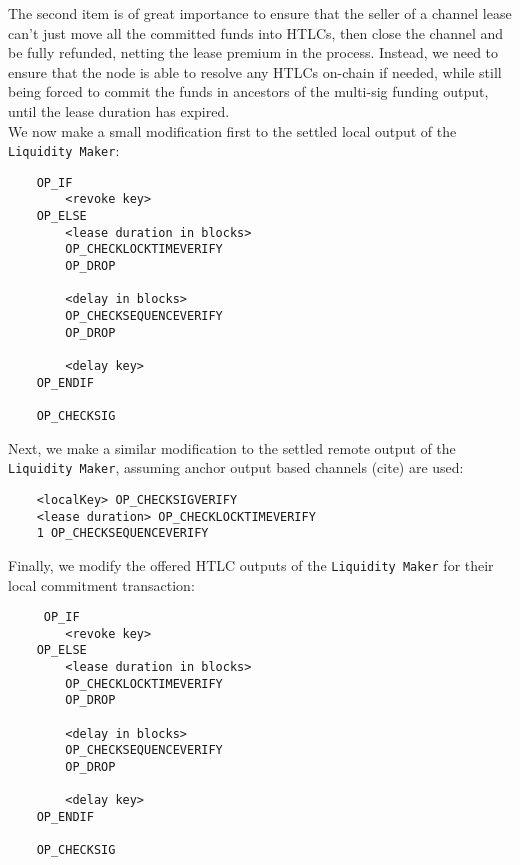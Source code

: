 \documentclass[10pt,a4paper]{article}
\theoremstyle{definition}
\begin{document}
The second item is of great importance to ensure that the seller of a channel
lease can't just move all the committed funds into HTLCs, then close the
channel and be fully refunded, netting the lease premium in the process.
Instead, we need to ensure that the node is able to resolve any HTLCs on-chain
if needed, while still being forced to commit the funds in ancestors of the
multi-sig funding output, until the lease duration has expired. \\

We now make a small modification first to the settled local output of the
\texttt{Liquidity Maker}:
\begin{center}
    \begin{verbatim}
    OP_IF
        <revoke key> 
    OP_ELSE
        <lease duration in blocks>
        OP_CHECKLOCKTIMEVERIFY
        OP_DROP
     
        <delay in blocks>
        OP_CHECKSEQUENCEVERIFY
        OP_DROP
        
        <delay key> 
    OP_ENDIF

    OP_CHECKSIG
    \end{verbatim} 
\end{center}

Next, we make a similar modification to the settled remote output of the
\texttt{Liquidity Maker}, assuming anchor output based channels (cite) are
used: 
\begin{center}
    \begin{verbatim}
    <localKey> OP_CHECKSIGVERIFY
    <lease duration> OP_CHECKLOCKTIMEVERIFY
    1 OP_CHECKSEQUENCEVERIFY
    \end{verbatim} 
\end{center}

Finally, we modify the offered HTLC outputs of the \texttt{Liquidity Maker} for
their local commitment transaction:
\begin{center}
    \begin{verbatim}
     OP_IF
        <revoke key> 
    OP_ELSE
        <lease duration in blocks>
        OP_CHECKLOCKTIMEVERIFY
        OP_DROP
     
        <delay in blocks>
        OP_CHECKSEQUENCEVERIFY
        OP_DROP
        
        <delay key> 
    OP_ENDIF

    OP_CHECKSIG
    \end{verbatim} 
\end{center}

\end{document}
